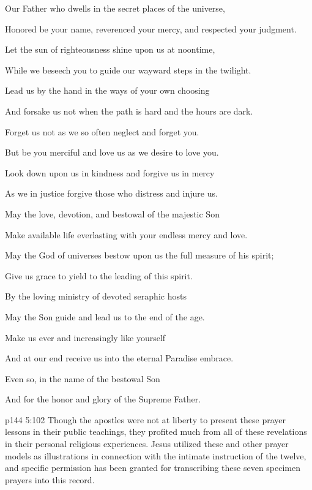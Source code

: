 \begin{quoting}[vskip=\baselineskip,leftmargin=2.75ex,rightmargin=2ex]
\setlength{\parindent}{-0.7em}
\hspace*{-1.2em}
Our Father who dwells in the secret places of the universe,\par
Honored be your name, reverenced your mercy, and respected your judgment.\par
Let the sun of righteousness shine upon us at noontime,\par
While we beseech you to guide our wayward steps in the twilight.\par
Lead us by the hand in the ways of your own choosing\par
And forsake us not when the path is hard and the hours are dark.\par
Forget us not as we so often neglect and forget you.\par
But be you merciful and love us as we desire to love you.\par
Look down upon us in kindness and forgive us in mercy\par
As we in justice forgive those who distress and injure us.\par
May the love, devotion, and bestowal of the majestic Son\par
Make available life everlasting with your endless mercy and love.\par
May the God of universes bestow upon us the full measure of his spirit;\par
Give us grace to yield to the leading of this spirit.\par
By the loving ministry of devoted seraphic hosts\par
May the Son guide and lead us to the end of the age.\par
Make us ever and increasingly like yourself\par
And at our end receive us into the eternal Paradise embrace.\par
Even so, in the name of the bestowal Son\par
And for the honor and glory of the Supreme Father.\par
\end{quoting}
\vs p144 5:102 Though the apostles were not at liberty to present these prayer lessons in their public teachings, they profited much from all of these revelations in their personal religious experiences. Jesus utilized these and other prayer models as illustrations in connection with the intimate instruction of the twelve, and specific permission has been granted for transcribing these seven specimen prayers into this record.\plusone
